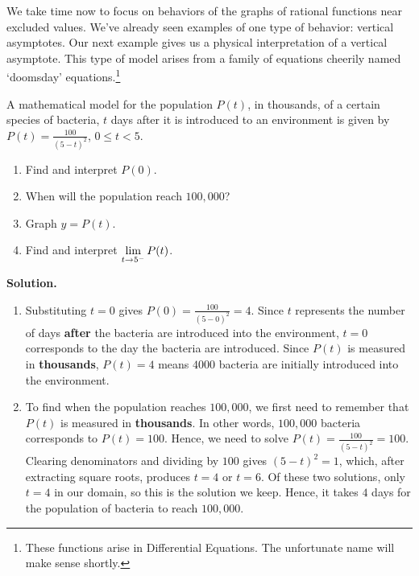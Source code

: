 \documentclass{ximera}
\begin{document}
We take time now to focus on behaviors of the graphs of rational functions near excluded values.  We've already seen examples of one type of behavior:  vertical asymptotes.  Our next example gives us a physical interpretation of a vertical asymptote.  This type of model arises from a family of equations cheerily named `doomsday' equations.\footnote{These functions arise in Differential Equations.  The unfortunate name will make sense shortly.}  

\begin{ex}  \label{doomsdaypopex} A mathematical model for the population $P(t)$, in thousands, of a certain species of bacteria, $t$ days after it is introduced to an environment is given by $P(t) = \frac{100}{(5-t)^{2}}$, $0 \leq t < 5$.


\begin{enumerate}

\item  Find and interpret $P(0)$.

\item  When will the population reach $100,\!000$?

\item  Graph $y = P(t)$.  

\item  Find and interpret $\ds{\lim_{t \rightarrow 5^{-}} P(t)}$.

\end{enumerate}

{ \bf Solution.}  

\begin{enumerate}

\item  Substituting $t=0$ gives $P(0) = \frac{100}{(5-0)^2} = 4$.  Since $t$ represents the number of days \textbf{after} the bacteria are introduced into the environment, $t =0$ corresponds to the day the bacteria are introduced.  Since $P(t)$ is measured in \textbf{thousands}, $P(t) = 4$  means $4000$ bacteria are initially introduced into the environment.

\item  To find when the population reaches $100,\! 000$, we first need to remember that $P(t)$ is measured in \textbf{thousands}.  In other words, $100,\! 000$ bacteria corresponds to $P(t) = 100$.  Hence, we need to solve  $P(t) = \frac{100}{(5-t)^2} = 100$.  Clearing denominators and dividing by $100$ gives $(5-t)^2=1$, which, after extracting square roots, produces $t = 4$ or $t=6$.  Of these two solutions, only $t=4$ in our domain, so this is the solution we keep.  Hence, it takes $4$ days for the population of bacteria to reach $100,\! 000$.


\end{enumerate}
\end{ex}
\end{document}
